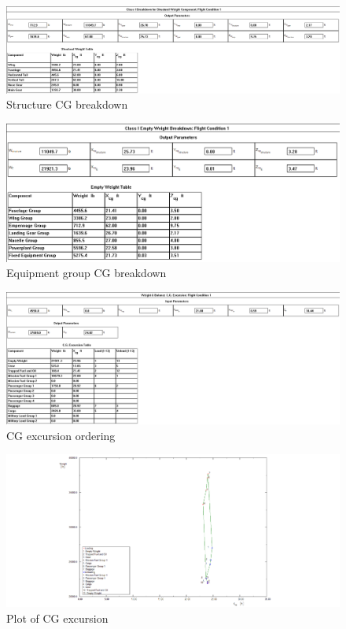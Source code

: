 \documentclass[conf]{new-aiaa}
\begin{document}
\begin{figure}[H]
    \includegraphics[width=\textwidth]{Report3Printouts/Cg/Cg_Empty_Detailed_Structure_cropped.png}
    \caption{Structure CG breakdown}
    \label{fig:cg_empty_detailed_structure}
\end{figure}


\begin{figure}[H]
    \includegraphics[width=\textwidth]{Report3Printouts/Cg/Cg_Empty_Fractions_cropped.png}
    \caption{Equipment group CG breakdown}
    \label{fig:cg_empty_fractions}
\end{figure}


\begin{figure}[H]
    \includegraphics[width=\textwidth]{Report3Printouts/Cg/Cg_Excursion_cropped.png}
    \caption{CG excursion ordering}
    \label{fig:cg_excursion}
\end{figure}

\begin{figure}[H]
    \includegraphics[width=\textwidth]{Report3Printouts/Cg/Cg_Excursion_Plot_cropped.png}
    \caption{Plot of CG excursion}
    \label{fig:cg_excursion_plot}
\end{figure}
\end{document}
